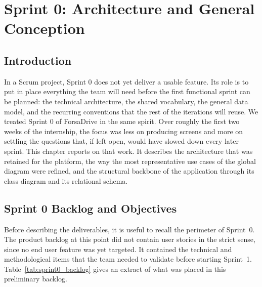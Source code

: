 \chapter{Sprint 0: Architecture and General Conception}

\clearpage
\section*{Introduction}

In a Scrum project, Sprint 0 does not yet deliver a usable feature. Its role is to put in place everything the team will need before the first functional sprint can be planned: the technical architecture, the shared vocabulary, the general data model, and the recurring conventions that the rest of the iterations will reuse. We treated Sprint 0 of ForsaDrive in the same spirit. Over roughly the first two weeks of the internship, the focus was less on producing screens and more on settling the questions that, if left open, would have slowed down every later sprint. This chapter reports on that work. It describes the architecture that was retained for the platform, the way the most representative use cases of the global diagram were refined, and the structural backbone of the application through its class diagram and its relational schema.

\section{Sprint 0 Backlog and Objectives}

Before describing the deliverables, it is useful to recall the perimeter of Sprint~0. The product backlog at this point did not contain user stories in the strict sense, since no end user feature was yet targeted. It contained the technical and methodological items that the team needed to validate before starting Sprint~1. Table~\ref{tab:sprint0_backlog} gives an extract of what was placed in this preliminary backlog.

